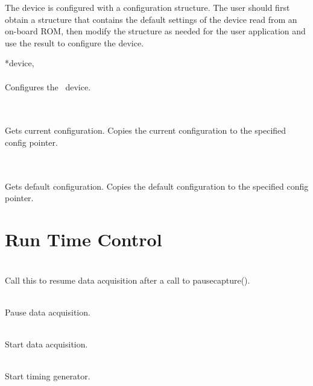 		The device is configured with a configuration structure. 
		The user should first obtain a structure that contains the default settings of the device read from an on-board ROM, 
		then modify the structure as needed for the user application and use the result to configure the device.\par

		 {*device,} \\ \\
		Configures the \deviceName\ device.\par

		 \\ \\
		Gets current configuration. Copies the current configuration to the specified config pointer.\par

		 \\ \\
		Gets default configuration. Copies the default configuration to the specified config pointer.\par

	

	\section{Run Time Control}

			\\
			Call this to resume data acquisition after a call to \textsf{\prefix pause\tu capture()}.\par

			\\
			Pause data acquisition.\par

			\\
			Start data acquisition.\par

			\\
			Start timing generator.\par

